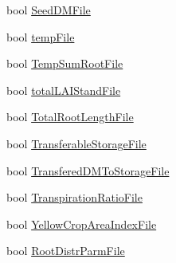 \begin{DoxyCompactItemize}
bool \hyperlink{classcrop_parameters_crop_a10dab1373771d7e4b2b4fed85a1edbe3}{SeedDMFile}
\item 
bool \hyperlink{classcrop_parameters_crop_a099da44c668282eefe14ae0755284bf8}{tempFile}
\item 
bool \hyperlink{classcrop_parameters_crop_a1e669e54f6c86c8a8eb124347490ba42}{TempSumRootFile}
\item 
bool \hyperlink{classcrop_parameters_crop_a1fb7d91fa527e0199327038d8232cd92}{totalLAIStandFile}
\item 
bool \hyperlink{classcrop_parameters_crop_a62691d4d31096f2f59ea41b82e5b3d7a}{TotalRootLengthFile}
\item 
bool \hyperlink{classcrop_parameters_crop_aa5c463a19379e9fd2eae17a5a3ea949e}{TransferableStorageFile}
\item 
bool \hyperlink{classcrop_parameters_crop_a1e7909ac358a26661331d603e68bff24}{TransferedDMToStorageFile}
\item 
bool \hyperlink{classcrop_parameters_crop_ae836957be63c238d0e3c286c0b8a8f1f}{TranspirationRatioFile}
\item 
bool \hyperlink{classcrop_parameters_crop_a7f39905c9ba5e2412e458e3b7615df67}{YellowCropAreaIndexFile}
\item 
bool \hyperlink{classcrop_parameters_crop_a1cbb45c51155b9644e1fd56380a83673}{RootDistrParmFile}
\end{DoxyCompactItemize}


